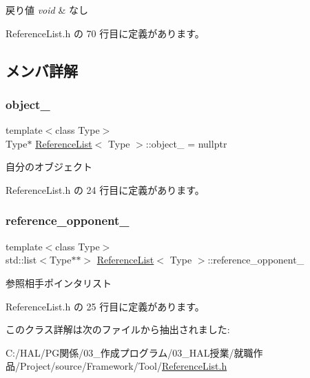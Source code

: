 \begin{DoxyRetVals}{戻り値}
{\em void} & なし \\
\hline
\end{DoxyRetVals}


 Reference\+List.\+h の 70 行目に定義があります。



\subsection{メンバ詳解}
\mbox{\label{class_reference_list_a4db4d51f2d810aea8668abdae6f0bd56}} 
\subsubsection{\texorpdfstring{object\+\_\+}{object\_}}
{\footnotesize\ttfamily template$<$class Type$>$ \\
Type$\ast$ \mbox{\hyperlink{class_reference_list}{Reference\+List}}$<$ Type $>$\+::object\+\_\+ = nullptr\hspace{0.3cm}{\ttfamily [private]}}



自分のオブジェクト 



 Reference\+List.\+h の 24 行目に定義があります。

\mbox{\label{class_reference_list_a3730c5bad58a49a53810c08f235b867c}} 
\subsubsection{\texorpdfstring{reference\+\_\+opponent\+\_\+}{reference\_opponent\_}}
{\footnotesize\ttfamily template$<$class Type$>$ \\
std\+::list$<$Type$\ast$$\ast$$>$ \mbox{\hyperlink{class_reference_list}{Reference\+List}}$<$ Type $>$\+::reference\+\_\+opponent\+\_\+\hspace{0.3cm}{\ttfamily [private]}}



参照相手ポインタリスト 



 Reference\+List.\+h の 25 行目に定義があります。



このクラス詳解は次のファイルから抽出されました\+:\begin{DoxyCompactItemize}
\item 
C\+:/\+H\+A\+L/\+P\+G関係/03\+\_\+作成プログラム/03\+\_\+\+H\+A\+L授業/就職作品/\+Project/source/\+Framework/\+Tool/\mbox{\hyperlink{_reference_list_8h}{Reference\+List.\+h}}\end{DoxyCompactItemize}
